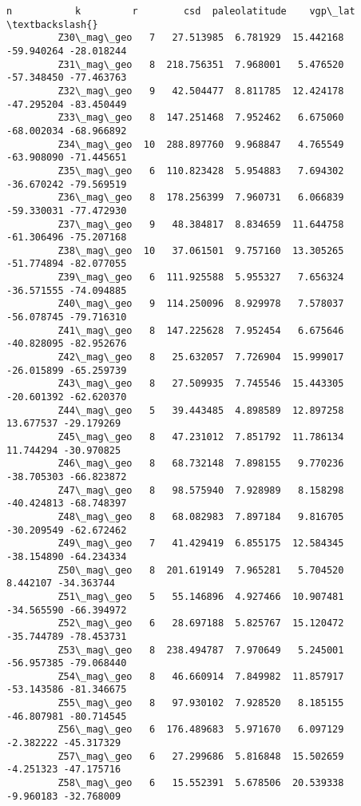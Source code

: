 \documentclass[11pt]{article}
\begin{document}
\begin{Verbatim}[commandchars=\\\{\}]
                       n           k         r        csd  paleolatitude    vgp\_lat  \textbackslash{}
         Z30\_mag\_geo   7   27.513985  6.781929  15.442168     -59.940264 -28.018244   
         Z31\_mag\_geo   8  218.756351  7.968001   5.476520     -57.348450 -77.463763   
         Z32\_mag\_geo   9   42.504477  8.811785  12.424178     -47.295204 -83.450449   
         Z33\_mag\_geo   8  147.251468  7.952462   6.675060     -68.002034 -68.966892   
         Z34\_mag\_geo  10  288.897760  9.968847   4.765549     -63.908090 -71.445651   
         Z35\_mag\_geo   6  110.823428  5.954883   7.694302     -36.670242 -79.569519   
         Z36\_mag\_geo   8  178.256399  7.960731   6.066839     -59.330031 -77.472930   
         Z37\_mag\_geo   9   48.384817  8.834659  11.644758     -61.306496 -75.207168   
         Z38\_mag\_geo  10   37.061501  9.757160  13.305265     -51.774894 -82.077055   
         Z39\_mag\_geo   6  111.925588  5.955327   7.656324     -36.571555 -74.094885   
         Z40\_mag\_geo   9  114.250096  8.929978   7.578037     -56.078745 -79.716310   
         Z41\_mag\_geo   8  147.225628  7.952454   6.675646     -40.828095 -82.952676   
         Z42\_mag\_geo   8   25.632057  7.726904  15.999017     -26.015899 -65.259739   
         Z43\_mag\_geo   8   27.509935  7.745546  15.443305     -20.601392 -62.620370   
         Z44\_mag\_geo   5   39.443485  4.898589  12.897258      13.677537 -29.179269   
         Z45\_mag\_geo   8   47.231012  7.851792  11.786134      11.744294 -30.970825   
         Z46\_mag\_geo   8   68.732148  7.898155   9.770236     -38.705303 -66.823872   
         Z47\_mag\_geo   8   98.575940  7.928989   8.158298     -40.424813 -68.748397   
         Z48\_mag\_geo   8   68.082983  7.897184   9.816705     -30.209549 -62.672462   
         Z49\_mag\_geo   7   41.429419  6.855175  12.584345     -38.154890 -64.234334   
         Z50\_mag\_geo   8  201.619149  7.965281   5.704520       8.442107 -34.363744   
         Z51\_mag\_geo   5   55.146896  4.927466  10.907481     -34.565590 -66.394972   
         Z52\_mag\_geo   6   28.697188  5.825767  15.120472     -35.744789 -78.453731   
         Z53\_mag\_geo   8  238.494787  7.970649   5.245001     -56.957385 -79.068440   
         Z54\_mag\_geo   8   46.660914  7.849982  11.857917     -53.143586 -81.346675   
         Z55\_mag\_geo   8   97.930102  7.928520   8.185155     -46.807981 -80.714545   
         Z56\_mag\_geo   6  176.489683  5.971670   6.097129      -2.382222 -45.317329   
         Z57\_mag\_geo   6   27.299686  5.816848  15.502659      -4.251323 -47.175716   
         Z58\_mag\_geo   6   15.552391  5.678506  20.539338      -9.960183 -32.768009   
         

\end{Verbatim}
\end{document}
